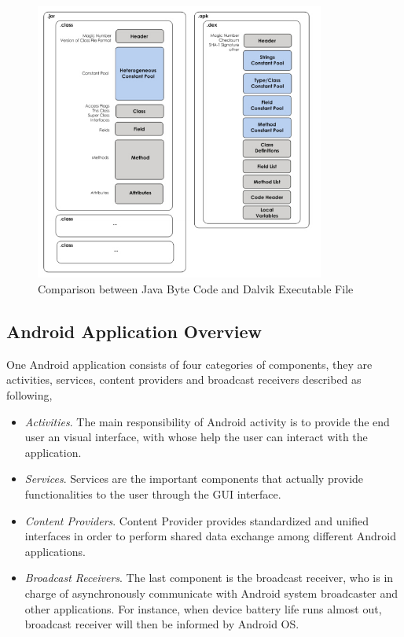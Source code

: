  \begin{figure}[!htb]
	\centering
	\includegraphics[width=0.85\textwidth]{clas-vs-dex.jpg}
		\caption{Comparison between Java Byte Code and Dalvik Executable File \cite{android_vm}}
	\label{fig:class-vs-dex}
\end{figure}

\subsection{Android Application Overview} \label{secAppComponents}
One Android application consists	 of four categories of components, they are activities, services, content providers and broadcast receivers \cite{android_secure_design} described as following,
\begin{itemize}
\item  \emph{Activities}. The main responsibility of Android activity is to provide the end user an visual interface, with whose help the user can interact with the application.  
\item  \emph{Services}. Services are the important components that actually provide functionalities to the user through the  GUI interface.
\item  \emph{Content Providers}. Content Provider provides standardized and unified interfaces in order to perform shared data exchange among different Android applications.
\item  \emph{Broadcast Receivers}. The last component is the broadcast receiver, who is in charge of  asynchronously communicate with Android system broadcaster and other applications. For instance, when device battery life runs almost out, broadcast receiver will then be informed by Android OS.
\end{itemize}

